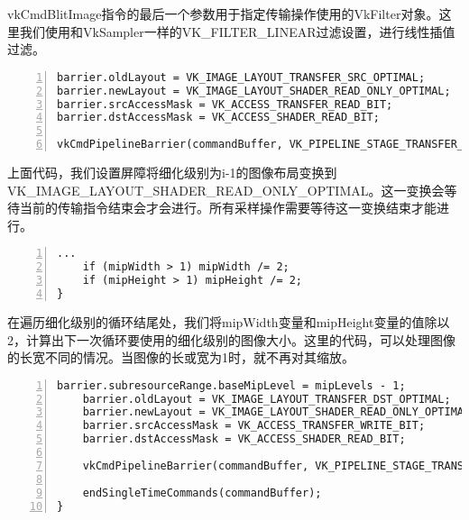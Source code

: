 \documentclass{ctexart}
\begin{document}
vkCmdBlitImage指令的最后一个参数用于指定传输操作使用的VkFilter对象。这里我们使用和VkSampler一样的VK\_FILTER\_LINEAR过滤设置，进行线性插值过滤。

\begin{lstlisting}[language={[ANSI]C},keywordstyle=\color{blue!70},commentstyle=\color{red!50!green!50!blue!50},frame=shadowbox, rulesepcolor=\color{red!20!green!20!blue!20},basicstyle=\small,numbers=left, numberstyle=\tiny,breaklines=true]
barrier.oldLayout = VK_IMAGE_LAYOUT_TRANSFER_SRC_OPTIMAL;
barrier.newLayout = VK_IMAGE_LAYOUT_SHADER_READ_ONLY_OPTIMAL;
barrier.srcAccessMask = VK_ACCESS_TRANSFER_READ_BIT;
barrier.dstAccessMask = VK_ACCESS_SHADER_READ_BIT;

vkCmdPipelineBarrier(commandBuffer, VK_PIPELINE_STAGE_TRANSFER_BIT, VK_PIPELINE_STAGE_FRAGMENT_SHADER_BIT, 0, 0, nullptr, 0, nullptr, 1, &barrier);
\end{lstlisting}

上面代码，我们设置屏障将细化级别为i-1的图像布局变换到VK\_IMAGE\_LAYOUT\_SHADER\_READ\_ONLY\_OPTIMAL。这一变换会等待当前的传输指令结束会才会进行。所有采样操作需要等待这一变换结束才能进行。

\begin{lstlisting}[language={[ANSI]C},keywordstyle=\color{blue!70},commentstyle=\color{red!50!green!50!blue!50},frame=shadowbox, rulesepcolor=\color{red!20!green!20!blue!20},basicstyle=\small,numbers=left, numberstyle=\tiny,breaklines=true]
		...
	if (mipWidth > 1) mipWidth /= 2;
	if (mipHeight > 1) mipHeight /= 2;
}
\end{lstlisting}

在遍历细化级别的循环结尾处，我们将mipWidth变量和mipHeight变量的值除以2，计算出下一次循环要使用的细化级别的图像大小。这里的代码，可以处理图像的长宽不同的情况。当图像的长或宽为1时，就不再对其缩放。

\begin{lstlisting}[language={[ANSI]C},keywordstyle=\color{blue!70},commentstyle=\color{red!50!green!50!blue!50},frame=shadowbox, rulesepcolor=\color{red!20!green!20!blue!20},basicstyle=\small,numbers=left, numberstyle=\tiny,breaklines=true]
	barrier.subresourceRange.baseMipLevel = mipLevels - 1;
	barrier.oldLayout = VK_IMAGE_LAYOUT_TRANSFER_DST_OPTIMAL;
	barrier.newLayout = VK_IMAGE_LAYOUT_SHADER_READ_ONLY_OPTIMAL;
	barrier.srcAccessMask = VK_ACCESS_TRANSFER_WRITE_BIT;
	barrier.dstAccessMask = VK_ACCESS_SHADER_READ_BIT;

	vkCmdPipelineBarrier(commandBuffer, VK_PIPELINE_STAGE_TRANSFER_BIT, VK_PIPELINE_STAGE_FRAGMENT_SHADER_BIT, 0, 0, nullptr, 0, nullptr, 1, &barrier);

	endSingleTimeCommands(commandBuffer);
}
\end{lstlisting}
\end{document}
